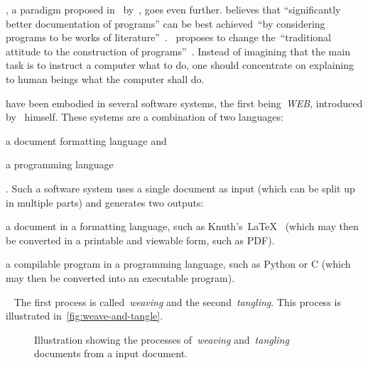 \documentclass[%
    a4paper,    %
    justified,  %
    nobib,      %
    openany     %
]{tufte-book}
\begin{document}
, a paradigm proposed
in~\citeyear{knuth-lp-1984} by~\citeauthor{knuth-lp-1984}, goes even further.
\citeauthor{knuth-lp-1984} believes that \enquote{significantly better
documentation of programs} can be best achieved~\enquote{by considering programs
to be works of literature}~\cite[p.
1]{knuth-lp-1984}.~\citeauthor{knuth-lp-1984} proposes to change
the~\enquote{traditional attitude to the construction of programs}~\cite[p.
1]{knuth-lp-1984}. Instead of imagining that the main task is to instruct a
computer what to do, one should concentrate on explaining to human beings what
the computer shall do.~\cite[p. 1]{knuth-lp-1984}

 have been embodied in several
software systems, the first being~\emph{WEB}, introduced
by~\citeauthor{knuth-lp-1984} himself. These systems are a combination of two
languages:
\begin{enumerate*}
  \item a document formatting language and
  \item a programming language
\end{enumerate*}.
Such a software system uses a single document as input (which can be split up in
multiple parts) and generates two outputs:
\begin{enumerate*}
  \item a document in a formatting language, such as
    Knuth's~\LaTeX{}~\cite{knuth-tex-1987} (which may then be converted in a
    printable and viewable form, such as PDF).
  \item a compilable program in a programming language, such as Python or C
    (which may then be converted into an executable program).
\end{enumerate*}~\cite{knuth-lp-1984}
The first process is called~\emph{weaving} and the second~\emph{tangling}. This
process is illustrated in~\autoref{fig:weave-and-tangle}.

\begin{figure}
  \label{fig:weave-and-tangle}
  \caption{Illustration showing the processes of~\emph{weaving}
    and~\emph{tangling} documents from a input document.~\cite{knuth-lp-1984}}
\end{figure}
\end{document}
